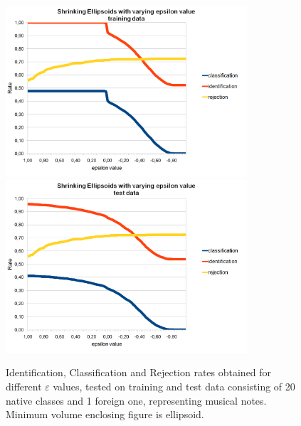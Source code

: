 \begin{figure}[htp]
	\centering
	\includegraphics[width=0.80\textwidth]{Figures/charts/MUSIC_NOTES/DIGITS_ShrinkingEllipsoidsToleranceTraining.png}
	\hspace{12pt}
	\includegraphics[width=0.80\textwidth]{Figures/charts/MUSIC_NOTES/DIGITS_ShrinkingEllipsoidsToleranceTest.png}
	\caption{ Identification, Classification and Rejection rates obtained for different $\varepsilon$ values, tested on training and test data consisting of 20 native classes and 1 foreign one, representing musical notes. Minimum volume enclosing figure is ellipsoid. }
	\label{fig:shrinking_music_notes}
\end{figure}

